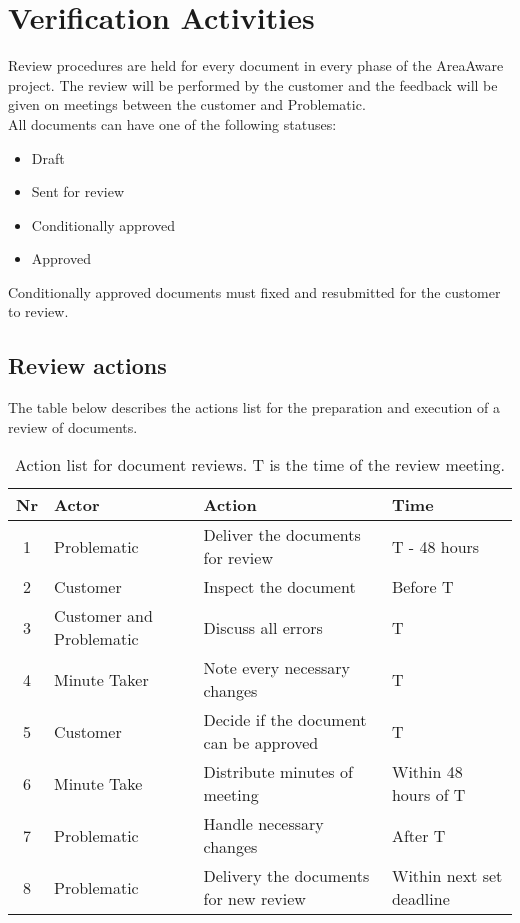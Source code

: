 \chapter{Verification Activities}
\label{chp:verificationActivities}

Review procedures are held for every document in every phase of the AreaAware project. 
The review will be performed by the customer and the feedback will be given on meetings between the customer and Problematic. \\
All documents can have one of the following statuses:
\begin{itemize}
    \item Draft
    \item Sent for review
    \item Conditionally approved
    \item Approved
\end{itemize}
Conditionally approved documents must fixed and resubmitted for the customer to review.

\section{Review actions}
The table below describes the actions list for the preparation and execution of a review of documents.
\begin{table}[ht]
    \centering
    \begin{tabular}{|c|l|p{5cm}|l|}
        \hline 
        \textbf{Nr} & \textbf{Actor} & \textbf{Action} & \textbf{Time} \\ 
        \hline
        1 & Problematic & Deliver the documents for review & T - 48 hours \\ 
        \hline  
        2 & Customer & Inspect the document & Before T \\ 
        \hline  
        3 & Customer and Problematic & Discuss all errors & T \\
        \hline
        4 & Minute Taker & Note every necessary changes & T \\
        \hline
        5 & Customer & Decide if the document can be approved & T \\
        \hline
        6 & Minute Take & Distribute minutes of meeting & Within 48 hours of T \\
        \hline
        7 & Problematic & Handle necessary changes & After T \\
        \hline
        8 & Problematic & Delivery the documents for new review & Within next set deadline \\ 
        \hline  
    \end{tabular}
    \caption{Action list for document reviews. T is the time of the review meeting.}
\end{table}